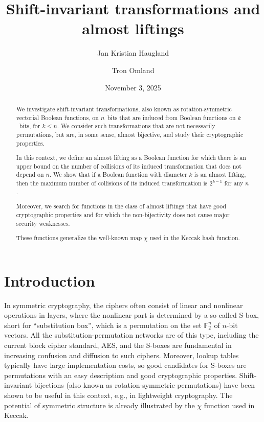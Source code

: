 \documentclass[11pt,english,a4paper]{amsart}
\title[Shift-invariant almost liftings]{Shift-invariant transformations and almost liftings}
\author[Haugland]{Jan Kristian Haugland}
\author[Omland]{Tron Omland}
\date{November 3, 2025}
\theoremstyle{plain}
\theoremstyle{definition}
\theoremstyle{remark}
\newcommand{\F}{\mathbb{F}}
\begin{document}
	
	\begin{abstract} 
		We investigate shift-invariant transformations, also known as rotation-symmetric vectorial Boolean functions, on $n$~bits that are induced from Boolean functions on $k$~bits, for $k\leq n$. We consider such transformations that are not necessarily permutations, but are, in some sense, almost bijective, and study their cryptographic properties.
        
        In this context, we define an almost lifting as a Boolean function for which there is an upper bound on the number of collisions of its induced transformation that does not depend on $n$. We show that if a Boolean function with diameter $k$ is an almost lifting, then the maximum number of collisions of its induced transformation is $2^{k-1}$ for any $n$.
		
		Moreover, we search for functions in the class of almost liftings that have good cryptographic properties and for which the non-bijectivity does not cause major security weaknesses.
		
		These functions generalize the well-known map $\chi$ used in the Keccak hash function.
	\end{abstract}
	
	\maketitle
	
	\section{Introduction}
	
	In symmetric cryptography, the ciphers often consist of linear and nonlinear operations in layers, where the nonlinear part is determined by a so-called S-box, short for ``substitution box'', which is a permutation on the set $\F_2^n$ of $n$-bit vectors. All the substitution-permutation networks are of this type, including the current block cipher standard, AES, and the S-boxes are fundamental in increasing confusion and diffusion to such ciphers.
	Moreover, lookup tables typically have large implementation costs, so good candidates for S-boxes are permutations with an easy description and good cryptographic properties. Shift-invariant bijections (also known as rotation-symmetric permutations) have been shown to be useful in this context, e.g., in lightweight cryptography. The potential of symmetric structure is already illustrated by the $\chi$ function used in Keccak.
	
\end{document}

